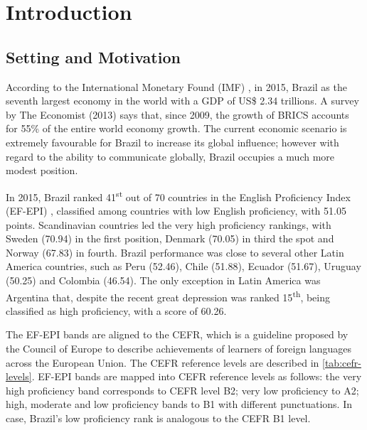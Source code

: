 \chapter{Introduction}\label{ch:introduction}

\section*{Setting and Motivation}

According to the International Monetary Found (IMF) \cite{IMF2015}, in 2015, Brazil as the seventh largest economy in the world with a GDP of US\$ 2.34 trillions. A survey by The Economist (2013) says that, since 2009, the growth of BRICS accounts for 55\% of the entire world economy growth. The current economic scenario is extremely favourable for Brazil to increase its global influence; however with regard to the ability to communicate globally, Brazil occupies a much more modest position. 

In 2015, Brazil ranked 41\textsuperscript{st} out of 70 countries in the English Proficiency Index (EF-EPI) \cite{EF2015}, classified among countries with low English proficiency, with 51.05 points. Scandinavian countries led the very high proficiency rankings, with Sweden (70.94) in the first position, Denmark (70.05) in third the spot and Norway (67.83) in fourth. Brazil performance was close to several other Latin America countries, such as Peru (52.46), Chile (51.88), Ecuador (51.67), Uruguay (50.25) and Colombia (46.54). The only exception in Latin America was Argentina that, despite the recent great depression was ranked 15\textsuperscript{th}, being classified as high proficiency, with a score of 60.26.

The \ac{EF-EPI} bands are aligned to the \ac{CEFR}, which is a guideline proposed by the Council of Europe to describe achievements of learners of foreign languages across the European Union. The \ac{CEFR} reference levels are described in \autoref{tab:cefr-levels}. \ac{EF-EPI} bands are mapped into \ac{CEFR} reference levels as follows: the very high proficiency band corresponds to \ac{CEFR} level B2; very low proficiency to A2; high, moderate and low proficiency bands to B1 with different punctuations. In case, Brazil's low proficiency rank is analogous to the \ac{CEFR} B1 level. 

